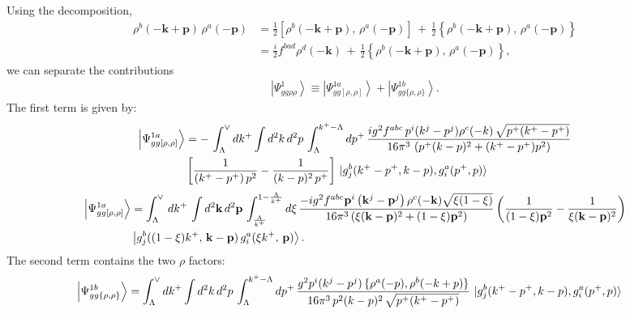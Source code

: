 \documentclass[aps,prd,amsmath,amssymb,nofootinbib]{revtex4-2}
\numberwithin{equation}{section}
\begin{document}
Using the decomposition,
\begin{align}\label{decomposition}
\rho^{b}(-\mathbf{k}+\mathbf{p})\,\rho^{a}(-\mathbf{p}) &= \frac{1}{2}\left[\rho^{b}(-\mathbf{k}+\mathbf{p}),\,\rho^{a}(-\mathbf{p})\right]\,+\,\frac{1}{2}\left\{ \rho^{b}(-\mathbf{k}+\mathbf{p}),\,\rho^{a}(-\mathbf{p})\right\} \\
&= \frac{i}{2}f^{bad}\rho^{d}(-\mathbf{k})\,+\,\frac{1}{2}\left\{ \rho^{b}(-\mathbf{k}+\mathbf{p}),\,\rho^{a}(-\mathbf{p})\right\}, 
\end{align}
we can separate the contributions
\begin{align}
\left|\Psi_{gg\rho\rho}^{1}\right\rangle \equiv \left|\Psi_{gg[\rho,\rho]}^{1a}\right\rangle + \left|\Psi_{gg\{\rho,\rho\}}^{1b}\right\rangle.
\end{align}
The first term is given by:
\begin{align}
    \left|\Psi_{gg[\rho,\rho]}^{1a}\right\rangle &= -\,\int_{\Lambda}^{\vee} dk^{+} \int d^{2}k\, d^{2}p\, \int_{\Lambda}^{k^{+}-\Lambda}dp^{+}\, \frac{ig^{2}f^{abc}\,p^{i}(k^{j}-p^{j})\rho^{c}(-k)\, \sqrt{p^{+}(k^{+}-p^{+})}}{16\pi^{3}\, \left(p^{+}(k-p)^{2}+(k^{+}-p^{+})p^{2}\right)}\notag \\ &  \left[\frac{1}{(k^{+}-p^{+})\,p^{2}} - \frac{1}{(k-p)^{2}\,p^{+}}\right]\, \ket{g^{b}_{j}(k^{+}-p^{+}, k-p),g^{a}_{i}(p^{+},p)}
\end{align}
\begin{align}\label{part 1}
\left|\Psi_{gg[\rho,\rho]}^{1a}\right\rangle &=\int_{\Lambda}^{\vee}\, dk^{+}\,\int d^{2}\mathbf{k}\, d^{2}\mathbf{p}\,\int_{\frac{\Lambda}{k^{+}}}^{1-\frac{\Lambda}{k^{+}}}d\xi\,\frac{-ig^{2}f^{abc}\mathbf{p}^{i}\left(\mathbf{k}^{j}-\mathbf{p}^{j}\right)\rho^{c}(-\mathbf{k})\sqrt{\xi(1-\xi)}}{16\pi^{3}\left(\xi(\mathbf{k}-\mathbf{p})^{2}+(1-\xi)\mathbf{p}^{2}\right)} \left(\frac{1}{(1-\xi)\mathbf{p}^{2}}-\frac{1}{\xi(\mathbf{k}-\mathbf{p})^{2}}\right)\notag \\ & \left|g_{j}^{b}((1-\xi)k^{+},\,\mathbf{k}-\mathbf{p})\,g_{i}^{a}(\xi k^{+},\,\mathbf{p})\right\rangle.
\end{align}
The second term contains the two $\rho$ factors:
\begin{align}
    \left|\Psi_{gg\{\rho,\rho\}}^{1b}\right\rangle & =  \int_{\Lambda}^{\vee} dk^{+} \int d^{2}k\, d^{2}p\, \int_{\Lambda}^{k^{+}-\Lambda}dp^{+}\, \frac{g^{2}p^{i}(k^{j}-p^{j})\,\{\rho^{a}(-p),\rho^{b}(-k+p)\}}{16\pi^{3}\,p^{2}(k-p)^{2}\, \sqrt{p^{+}(k^{+}-p^{+})}}\, \ket{g^{b}_{j}(k^{+}-p^{+}, k-p),g^{a}_{i}(p^{+},p)}
\end{align}
\end{document}
